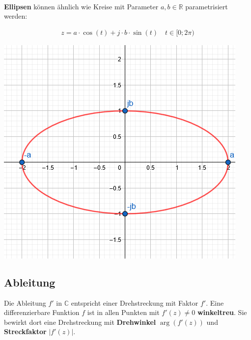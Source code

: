 ~\\
\begin{minipage}{\columnwidth}	
	\noindent\textbf{Ellipsen} können ähnlich wie Kreise mit Parameter $a,b \in \mathbb{R}$ parametrisiert werden:
	
	\begin{minipage}{0.6\textwidth}
		\begin{align*}
			z = a\cdot\cos(t) + j\cdot b \cdot \sin(t) \quad t \in [0; 2\pi)
		\end{align*}
	\end{minipage}%
	\begin{minipage}{0.4\textwidth}
		\includegraphics[width=\columnwidth]{Images/parameter_ellipse}
	\end{minipage}
\end{minipage}

\subsection{Ableitung}
Die Ableitung $f'$ in $\mathbb{C}$ entspricht einer Drehstreckung mit Faktor $f'$. Eine differenzierbare Funktion $f$ ist in allen Punkten mit $f'(z) \neq 0$ \textbf{winkeltreu}. Sie bewirkt dort eine Drehstreckung mit \textbf{Drehwinkel} $\arg(f'(z))$ und \textbf{Streckfaktor} $|f'(z)|$.


